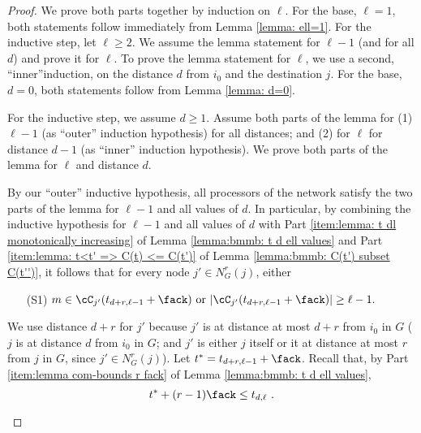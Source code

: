 \begin{proof}
We prove both parts together by induction on $\ell$.
For the base, $\ell= 1$, both statements follow
immediately from Lemma \ref{lemma: ell=1}.
For the inductive step, let $\ell\geq 2$.
We assume the lemma
statement for $\ell-1$ (and for all $d$) and prove it for $\ell$.
To prove the lemma statement for $\ell$, we use a second, ``inner''induction, on the distance
$d$ from $i_0$ and the destination $j$.
For the base, $d = 0$, both statements
follow from Lemma \ref{lemma: d=0}.


For the inductive step, we assume $d \geq 1$.
Assume both parts of the lemma for
(1) $\ell -1$ (as ``outer'' induction hypothesis) for all distances;
and (2) for $\ell$ for distance $d-1$ (as ``inner'' induction hypothesis).
We prove both parts of the lemma for $\ell$ and distance $d$.


By our ``outer'' inductive hypothesis, all processors of the network satisfy the two parts of the lemma for $\ell-1$ and all values of $d$.
In particular, by combining the inductive hypothesis for $\ell-1$  and all values of $d$ with
Part \ref{item:lemma: t dl monotonically increasing} of Lemma \ref{lemma:bmmb: t d ell values} and
Part \ref{item:lemma: t<t' => C(t) <= C(t')} of Lemma \ref{lemma:bmmb: C(t') subset C(t'')},
it follows that for every node $j' \in N^r_G(j)$,
either
\begin{itemize}

\item [(S1)] $m\in \cC_{j'}(t_{d+r,\ell-1}+\fack) \mbox{ or } |\cC_{j'}(t_{d+r,\ell-1}+\fack)|\geq \ell-1.$

\end{itemize}
We use distance $d+r$ for $j'$ because $j'$ is at distance at most $d+r$ from $i_0$ in $G$
($j$ is at distance $d$ from $i_0$ in $G$; and $j'$ is either $j$ itself or it at distance at most $r$ from $j$ in $G$, since $j' \in N^r_G(j)$).
Let $t^*= t_{d+r,\ell-1}+\fack$.
Recall that,
by Part \ref{item:lemma com-bounds r fack} of Lemma \ref{lemma:bmmb: t d ell values},
\begin{equation}
t^* + (r-1) \fack \leq t_{d,\ell}~.
\label{ineq:lemma: t d+r ell-1 leq t d ell}
\end{equation}

\begin{enumerate}


\end{enumerate}
\end{proof}
